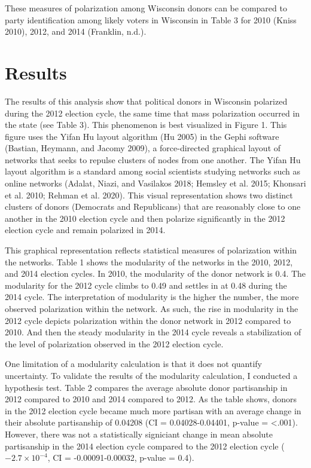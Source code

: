 \documentclass[12pt,]{article}
\begin{document}
These measures of polarization among Wisconsin donors can be compared to
party identification among likely voters in Wisconsin in Table 3 for
2010 (Kniss 2010), 2012, and 2014 (Franklin, n.d.).

\hypertarget{results}{%
\section{Results}\label{results}}

The results of this analysis show that political donors in Wisconsin
polarized during the 2012 election cycle, the same time that mass
polarization occurred in the state (see Table 3). This phenomenon is
best visualized in Figure 1. This figure uses the Yifan Hu layout
algorithm (Hu 2005) in the Gephi software (Bastian, Heymann, and Jacomy
2009), a force-directed graphical layout of networks that seeks to
repulse clusters of nodes from one another. The Yifan Hu layout
algorithm is a standard among social scientists studying networks such
as online networks (Adalat, Niazi, and Vasilakos 2018; Hemsley et al.
2015; Khonsari et al. 2010; Rehman et al. 2020). This visual
representation shows two distinct clusters of donors (Democrats and
Republicans) that are reasonably close to one another in the 2010
election cycle and then polarize significantly in the 2012 election
cycle and remain polarized in 2014.

This graphical representation reflects statistical measures of
polarization within the networks. Table 1 shows the modularity of the
networks in the 2010, 2012, and 2014 election cycles. In 2010, the
modularity of the donor network is 0.4. The modularity for the 2012
cycle climbs to 0.49 and settles in at 0.48 during the 2014 cycle. The
interpretation of modularity is the higher the number, the more observed
polarization within the network. As such, the rise in modularity in the
2012 cycle depicts polarization within the donor network in 2012
compared to 2010. And then the steady modularity in the 2014 cycle
reveals a stabilization of the level of polarization observed in the
2012 election cycle.

One limitation of a modularity calculation is that it does not quantify
uncertainty. To validate the results of the modularity calculation, I
conducted a hypothesis test. Table 2 compares the average absolute donor
partisanship in 2012 compared to 2010 and 2014 compared to 2012. As the
table shows, donors in the 2012 election cycle became much more partisan
with an average change in their absolute partisanship of 0.04208 (CI =
0.04028-0.04401, p-value = \textless.001). However, there was not a
statistically signiciant change in mean absolute partisanship in the
2014 election cycle compared to the 2012 election cycle
(\ensuremath{-2.7\times 10^{-4}}, CI = -0.00091-0.00032, p-value = 0.4).
\end{document}

